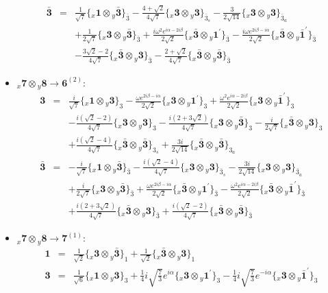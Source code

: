 \documentclass[english]{article}
\newcommand{\rep}[1]{\mathbf{#1}}
\newcommand{\repx}[2]{{}_{#2}\mathbf{#1}}
\newcommand{\subcg}[3]{\big\{ \repx{#1}{x}\otimes\repx{#2}{y}\big\}^{}_{#3}}
\begin{document}
\begin{itemize}
\begin{eqnarray*}
\rep{\bar{3}} &=& \frac{1}{\sqrt{7}}\subcg{1}{\bar{3}}{\bar{3}}-\frac{4+\sqrt{2}}{4 \sqrt{7}}\subcg{3}{3}{\bar{3}_{s}}-\frac{3}{2 \sqrt{14}}\subcg{3}{3}{\bar{3}_{a}} \\ 
 & & +\frac{1}{2 \sqrt{7}}\subcg{3}{\bar{3}}{\bar{3}}+\frac{i \omega ^2 e^{i \alpha -2 i \beta }}{2 \sqrt{2}}\subcg{\bar{3}}{1^{\prime}}{\bar{3}}-\frac{i \omega  e^{2 i \beta -i \alpha }}{2 \sqrt{2}}\subcg{\bar{3}}{\bar{1}^{\prime}}{\bar{3}} \\ 
 & & -\frac{3 \sqrt{2}-2}{4 \sqrt{7}}\subcg{\bar{3}}{3}{\bar{3}}-\frac{2+\sqrt{2}}{4 \sqrt{7}}\subcg{\bar{3}}{\bar{3}}{\bar{3}}
\end{eqnarray*}
\item $\repx{7}{x}\otimes\repx{8}{y}\to\rep{6}^{(2)}$:
\begin{eqnarray*}
\rep{3} &=& \frac{i}{\sqrt{7}}\subcg{1}{3}{3}-\frac{\omega  e^{2 i \beta -i \alpha }}{2 \sqrt{2}}\subcg{3}{1^{\prime}}{3}+\frac{\omega ^2 e^{i \alpha -2 i \beta }}{2 \sqrt{2}}\subcg{3}{\bar{1}^{\prime}}{3} \\ 
 & & -\frac{i \left(\sqrt{2}-2\right)}{4 \sqrt{7}}\subcg{3}{3}{3}-\frac{i \left(2+3 \sqrt{2}\right)}{4 \sqrt{7}}\subcg{3}{\bar{3}}{3}-\frac{i}{2 \sqrt{7}}\subcg{\bar{3}}{3}{3} \\ 
 & & +\frac{i \left(\sqrt{2}-4\right)}{4 \sqrt{7}}\subcg{\bar{3}}{\bar{3}}{3_{s}}+\frac{3 i}{2 \sqrt{14}}\subcg{\bar{3}}{\bar{3}}{3_{a}}
\\
\rep{\bar{3}} &=& -\frac{i}{\sqrt{7}}\subcg{1}{\bar{3}}{\bar{3}}-\frac{i \left(\sqrt{2}-4\right)}{4 \sqrt{7}}\subcg{3}{3}{\bar{3}_{s}}-\frac{3 i}{2 \sqrt{14}}\subcg{3}{3}{\bar{3}_{a}} \\ 
 & & +\frac{i}{2 \sqrt{7}}\subcg{3}{\bar{3}}{\bar{3}}+\frac{\omega  e^{2 i \beta -i \alpha }}{2 \sqrt{2}}\subcg{\bar{3}}{1^{\prime}}{\bar{3}}-\frac{\omega ^2 e^{i \alpha -2 i \beta }}{2 \sqrt{2}}\subcg{\bar{3}}{\bar{1}^{\prime}}{\bar{3}} \\ 
 & & +\frac{i \left(2+3 \sqrt{2}\right)}{4 \sqrt{7}}\subcg{\bar{3}}{3}{\bar{3}}+\frac{i \left(\sqrt{2}-2\right)}{4 \sqrt{7}}\subcg{\bar{3}}{\bar{3}}{\bar{3}}
\end{eqnarray*}
\item $\repx{7}{x}\otimes\repx{8}{y}\to\rep{7}^{(1)}$:
\begin{eqnarray*}
\rep{1} &=& \frac{1}{\sqrt{2}}\subcg{3}{\bar{3}}{1}+\frac{1}{\sqrt{2}}\subcg{\bar{3}}{3}{1}
\\
\rep{3} &=& \frac{1}{\sqrt{6}}\subcg{1}{3}{3}+\frac{1}{4} i \sqrt{\frac{7}{3}} e^{i \alpha }\subcg{3}{1^{\prime}}{3}-\frac{1}{4} i \sqrt{\frac{7}{3}} e^{-i \alpha }\subcg{3}{\bar{1}^{\prime}}{3} \\ 

\end{eqnarray*}
\end{itemize}
\end{document}

